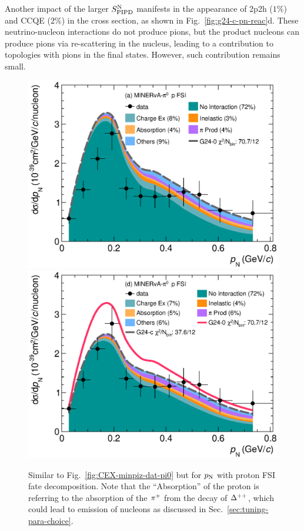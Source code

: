 Another impact of the larger $S_\textrm{PIPD}^\textrm{N}$ manifests in the appearance of 2p2h ($1\%$) and CCQE ($2 \%$) in the \minpiz cross section, as shown in Fig.~\ref{fig:g24-c-pn-reac}d. These neutrino-nucleon interactions do not produce pions, but the product nucleons can produce pions via re-scattering in the nucleus, leading to a contribution to topologies with pions in the final states. However, such contribution remains small.

\begin{figure}[!htb] 	
    \centering 		
    \includegraphics[width=\dbfigwid\textwidth]{figures/0000-min_pi0_pn_pr_decomp_cex.eps}
    \includegraphics[width=\dbfigwid\textwidth]{figures/0026-min_pi0_pn_pr_decomp.eps}	
    \caption{\label{fig:minpiz-pn-pr} Similar to Fig.~\ref{fig:CEX-minpiz-dat-pi0} but for $p_\textrm{N}$ with proton FSI fate decomposition. Note that the ``Absorption'' of the proton is referring to the absorption of the $\pi^+$ from the decay of $\Delta^{++}$, which could lead to emission of nucleons as discussed in Sec.~\ref{sec:tuning-para-choice}.     
    } 
\end{figure}

